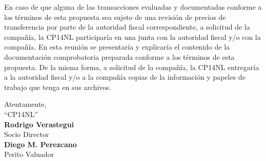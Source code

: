 \documentclass[5pt,letter]{report}
\begin{document}
\begin{enumerate}[A)]
En caso de que alguna de las transacciones evaluadas y documentadas conforme a los términos de esta propuesta sea sujeto de una revisión de precios de transferencia por parte de la autoridad fiscal correspondiente, a solicitud de la compañía, la \textcolor{principal}{CP14NL} participaría en una junta con la autoridad fiscal y/o con la compañía. En esta reunión se presentaría y explicaría el contenido de la documentación comprobatoria preparada conforme a los términos de esta propuesta. De la misma forma, a solicitud de la compañía, la \textcolor{principal}{CP14NL} entregaría a la autoridad fiscal y/o a la compañía copias de la información y papeles de trabajo que tenga en sus archivos.\\[5pt]

\end{enumerate} 

Atentamente, \\

\textcolor{principal}{``CP14NL''}\\

\noindent
\textcolor{principal}{\textbf{Rodrigo Verastegui}}\\[1pt]
Socio Director\\[5pt]
\noindent
\textcolor{principal}{\textbf{Diego M. Perezcano}}\\[1pt]
Perito Valuador
\end{document}
